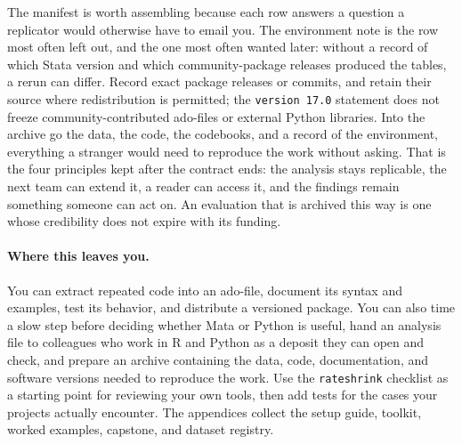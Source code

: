 The manifest is worth assembling because each row answers a question a replicator would otherwise have to email you. The environment note is the row most often left out, and the one most often wanted later: without a record of which Stata version and which community-package releases produced the tables, a rerun can differ. Record exact package releases or commits, and retain their source where redistribution is permitted; the \texttt{version 17.0} statement does not freeze community-contributed ado-files or external Python libraries. Into the archive go the data, the code, the codebooks, and a record of the environment, everything a stranger would need to reproduce the work without asking. That is the four principles kept after the contract ends: the analysis stays replicable, the next team can extend it, a reader can access it, and the findings remain something someone can act on. An evaluation that is archived this way is one whose credibility does not expire with its funding.

\paragraph{Where this leaves you.} You can extract repeated code into an ado-file, document its syntax and examples, test its behavior, and distribute a versioned package. You can also time a slow step before deciding whether Mata or Python is useful, hand an analysis file to colleagues who work in R and Python as a deposit they can open and check, and prepare an archive containing the data, code, documentation, and software versions needed to reproduce the work. Use the \texttt{rateshrink} checklist as a starting point for reviewing your own tools, then add tests for the cases your projects actually encounter. The appendices collect the setup guide, toolkit, worked examples, capstone, and dataset registry.

